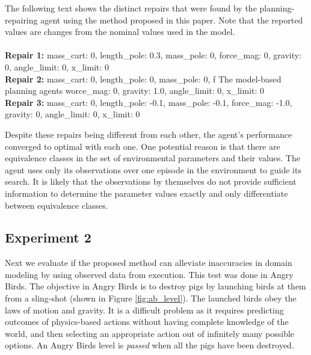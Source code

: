 \documentclass[letterpaper]{article} %
\newenvironment{console}{\ttfamily}{\par}
\begin{document}
The following text shows the distinct repairs that were found by the planning-repairing agent using the method proposed in this paper. Note that the reported values are changes from the nominal values used in the model. \\
\\
\begin{console}
\small
     \textbf{Repair 1:} {mass\_cart: 0, length\_pole: 0.3, mass\_pole: 0, force\_mag: 0, gravity: 0, angle\_limit: 0, x\_limit: 0} \\
    \textbf{Repair 2:} {mass\_cart: 0, length\_pole: 0, mass\_pole: 0, f
The model-based planning agents worce\_mag: 0, gravity: 1.0, angle\_limit: 0, x\_limit: 0}
    \\
    \textbf{Repair 3:} {mass\_cart: 0, length\_pole: -0.1, mass\_pole: -0.1, force\_mag: -1.0, gravity: 0, angle\_limit: 0, x\_limit: 0}
\end{console}
\smallskip
Despite these repairs being different from each other, the agent's performance converged to optimal with each one. One potential reason is that there are equivalence classes in the set of environmental parameters and their values. The agent uses only its observations over one episode in the environment to guide its search. It is likely that the observations by themselves do not provide sufficient information to determine the parameter values exactly and only differentiate between equivalence classes. 

\subsection{Experiment 2}
Next we evaluate if the proposed method can alleviate inaccuracies in domain modeling by using observed data from execution. This test was done in Angry Birds. The objective in Angry Birds is to destroy pigs by launching birds at them from a sling-shot (shown in Figure \ref{fig:ab_level}). The launched birds obey the laws of motion and gravity. It is a difficult problem as it requires predicting outcomes of physics-based actions without having complete knowledge of the world, and then selecting an appropriate action out of infinitely many possible options. An Angry Birds level is \emph{passed} when all the pigs have been destroyed. 
\end{document}
